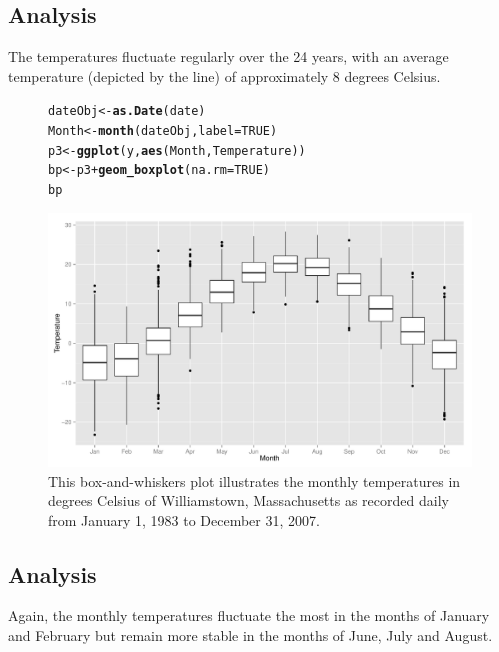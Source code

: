 \documentclass{article}\usepackage{graphicx, color}
\makeatletter
\def\maxwidth{ %
  \ifdim\Gin@nat@width>\linewidth
    \linewidth
  \else
    \Gin@nat@width
  \fi
}
\newcommand{\hlfunctioncall}[1]{\textcolor[rgb]{0.501960784313725,0,0.329411764705882}{\textbf{#1}}}%
\newenvironment{kframe}{%
 \def\at@end@of@kframe{}%
 \ifinner\ifhmode%
  \def\at@end@of@kframe{\end{minipage}}%
  \begin{minipage}{\columnwidth}%
 \fi\fi%
 \def\FrameCommand##1{\hskip\@totalleftmargin \hskip-\fboxsep
 \colorbox{shadecolor}{##1}\hskip-\fboxsep
     \hskip-\linewidth \hskip-\@totalleftmargin \hskip\columnwidth}%
 \MakeFramed {\advance\hsize-\width
   \@totalleftmargin\z@ \linewidth\hsize
   \@setminipage}}%
 {\par\unskip\endMakeFramed%
 \at@end@of@kframe}
\newenvironment{knitrout}{}{} %
\makeatother
\begin{document}
\subsection{Analysis}
The temperatures fluctuate regularly over the 24 years, with an average temperature (depicted by the line) of approximately
8 degrees Celsius.

\begin{figure}
\begin{knitrout}
\color{fgcolor}\begin{kframe}
\begin{alltt}
dateObj <- \hlfunctioncall{as.Date}(date)
Month <- \hlfunctioncall{month}(dateObj, label = TRUE)
p3 <- \hlfunctioncall{ggplot}(y, \hlfunctioncall{aes}(Month, Temperature))
bp <- p3 + \hlfunctioncall{geom_boxplot}(na.rm = TRUE)
bp
\end{alltt}
\end{kframe}
\includegraphics[width=\maxwidth]{figure/graph3BoxPlot} 

\end{knitrout}

\caption{This box-and-whiskers plot illustrates the monthly temperatures in degrees Celsius of Williamstown, Massachusetts as recorded daily from January 1, 1983 to December 31, 2007.}
\end{figure}

\subsection{Analysis}
Again, the monthly temperatures fluctuate the most in the months of January and February but remain more stable in the months of June, July and August.
\end{document}
